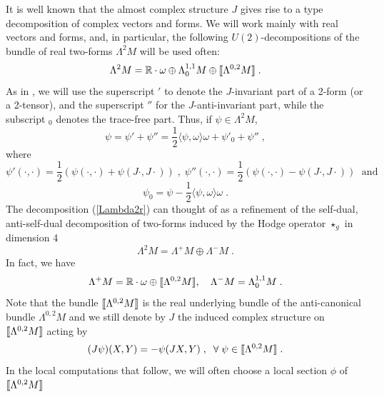 \documentclass{amsart}
\newcommand{\La}{\Lambda}
\newcommand{\leftr}{[\hbox{\hspace{-0.15em}}[}
\newcommand{\rightr}{]\hbox{\hspace{-0.15em}}]}
\begin{document}
It is well known that the almost complex structure $J$ gives rise to a type decomposition of complex vectors and forms. We will work mainly with real vectors and forms, and, in particular, the following $U(2)$-decompositions of the bundle of real two-forms $\Lambda^2 M$ 
will be used often:
\begin{equation}\label{Lambda2r}
\La^2M = {\mathbb R}\cdot \omega\oplus \La^{1,1}_0 M \oplus \leftr
\La^{0,2}M
\rightr \; .
\end{equation}
As in \cite{AAD}, we will use the superscript $'$ to denote the $J$-invariant part of a 2-form (or a 2-tensor), and the superscript $''$ for the $J$-anti-invariant part, while the subscript $_0$ denotes the trace-free part. Thus, if $\psi \in \La^2 M$,
$$ \psi = \psi' + \psi'' = \frac{1}{2} \langle \psi, \omega \rangle \omega +\psi'_0 + \psi'' \; , $$
where
$$\psi'(\cdot , \cdot) = \frac{1}{2}(\psi(\cdot , \cdot) + \psi(J\cdot,
J\cdot)) \; , \;
\psi''(\cdot , \cdot) = \frac{1}{2}(\psi(\cdot , \cdot) - \psi(J\cdot,
J\cdot))  \; \mbox{ and } $$
$$ \psi_0 = \psi - \frac{1}{2} \langle \psi, \omega \rangle \omega \; .$$ 
The decomposition (\ref{Lambda2r}) can thought of as a refinement of the self-dual, anti-self-dual decomposition of two-forms induced by the Hodge operator $\star_g$ in dimension 4 
\begin{equation*}\label{SO(4)La2}
\La^2 M = \La^+ M \oplus \La^-M \; .
\end{equation*}
 In fact, we have
\begin{equation}\label{U(2)La+}
\La^+M = {\mathbb R}\cdot \omega \oplus \leftr
\La^{0,2}M \rightr, \ \ \
\La^-M = \La^{1,1}_0 M \; .
\end{equation}
Note that the bundle $\leftr \La^{0,2}M \rightr$ is the real underlying bundle of the anti-canonical bundle $ \La^{0,2}M $ and we still denote by $J$ the induced complex structure on $\leftr \La^{0,2}M \rightr$ acting by
$$ (J\psi)(X,Y) =- \psi(JX, Y) \; , \; \; \forall \; \psi \in \leftr \La^{0,2}M \rightr \; .$$
In the local computations that follow, we will often choose a local section $\phi$ of $\leftr \La^{0,2}M \rightr$ 
\end{document}
